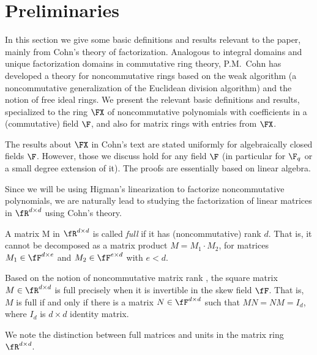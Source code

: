 \section{Preliminaries}\label{prelim}
%

In this section we give some basic definitions and results relevant to
the paper, mainly from Cohn's theory of factorization.  Analogous to
integral domains and unique factorization domains in commutative ring
theory, P.M.~Cohn \cite{Cohnfir,Cohnintro} has developed a theory for
noncommutative rings based on the weak algorithm (a noncommutative
generalization of the Euclidean division algorithm) and the notion of
free ideal rings. We present the relevant basic definitions and
results, specialized to the ring $\FX$ of noncommutative polynomials
with coefficients in a (commutative) field $\F$, and also for matrix
rings with entries from $\FX$.

The results about $\FX$ in Cohn's text \cite[Chapter 5]{Cohnfir} are
stated uniformly for algebraically closed fields $\F$. However, those
we discuss hold for any field $\F$ (in particular for $\F_q$ or a
small degree extension of it). The proofs are essentially based on
linear algebra.

%
%
%
%

%
%
%
%
%

Since we will be using Higman's linearization \cite{Hig} to factorize
noncommutative polynomials, we are naturally lead to studying the
factorization of linear matrices in $\fR^{d\times d}$ using Cohn's
theory.

\begin{definition}{\rm\cite{Cohnfir}}
A matrix M in $\fR^{d\times d}$ is called \emph{full} if it has
(noncommutative) rank $d$. That is, it cannot be decomposed as a
matrix product $M= M_1\cdot M_2$, for matrices $M_1 \in \fF^{d \times
  e}$ and $M_2 \in \fF^{e \times d}$ with $e <d$.
\end{definition}

\begin{remark}
 Based on the notion of noncommutative matrix rank \cite{Cohnfir}, the
 square matrix $M\in\fR^{d\times d}$ is full precisely when it is
 invertible in the skew field $\fF$. That is, $M$ is full if and only
 if there is a matrix $N\in\fF^{d\times d}$ such that $MN=NM=I_d$, where $I_d$ is $d \times
d$ identity matrix.
\end{remark}

We note the distinction between full matrices and units in the matrix
ring $\fR^{d\times d}$.

